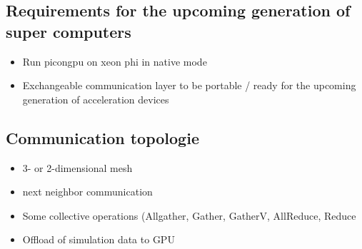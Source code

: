 \subsection{Requirements for the upcoming generation of super computers}
\begin{itemize}
\item Run picongpu on xeon phi in native mode
\item Exchangeable communication layer to be portable / ready  for the upcoming
  generation of acceleration devices
\end{itemize}

\subsection{Communication topologie}
\begin{itemize}
\item 3- or 2-dimensional mesh
\item next neighbor communication
\item Some collective operations (Allgather, Gather, GatherV, AllReduce, Reduce
\item Offload of simulation data to GPU
\end{itemize}


\cleardoublepage

